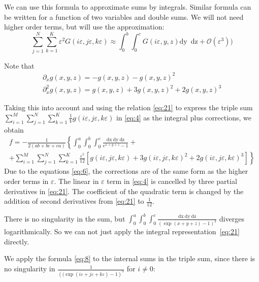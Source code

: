 \documentclass{article}
\newcommand{\dx}{\mathrm{dx}~}
\newcommand{\dy}{\mathrm{dy}~}
\newcommand{\dz}{\mathrm{dz}}
\begin{document}
We can use this formula to approximate sums by integrals. Similar formula can be written for a
function of two variables and double sums. We will not need higher order terms, but will use the
approximation:
\begin{equation}
\label{eq:8}
  \sum_{j=1}^{N}\sum_{k=1}^{K}\varepsilon^{2}G\left(i\varepsilon,j\varepsilon,k\varepsilon\right)\approx \int_{0}^{b}\int_{0}^{c}G(i\varepsilon,y,z) \dy\; \dz+\mathcal{O}(\varepsilon^{3}))
\end{equation}


Note that
\begin{equation}
  \label{eq:6}
  \begin{array}{c}
    \partial_{x}g(x,y,z)=-g(x,y,z)-g(x,y,z)^{2}\\
    \partial_{x}^{2}g(x,y,z)=g(x,y,z)+3g(x,y,z)^{2}+2g(x,y,z)^{3}
  \end{array}
\end{equation}

Taking this into account and using the relation \eqref{eq:21} to express the triple sum
$ \sum_{i=1}^{M} \sum_{j=1}^{N} \sum_{k=1}^{K} \frac{1}{V}    g(i\varepsilon,j\varepsilon,k\varepsilon)$
in \eqref{eq:4} as the integral plus corrections, we obtain
\begin{multline}
\label{eq:23}
 f=-\frac{1}{2(ab+bc+ca)}\left\{\int_{0}^{a} \int_{0}^{b}\int_{0}^{c}\frac{\dx \dy \dz}{e^{x+y+z}-1}+\right.\\
  \left.+\sum_{i=1}^{M}\sum_{j=1}^{N}\sum_{k=1}^{K}\frac{\varepsilon^{5}}{12}\left[g(i\varepsilon,j\varepsilon,k\varepsilon)+3
      g(i\varepsilon,j\varepsilon,k\varepsilon)^{2}+2
      g(i\varepsilon,j\varepsilon,k\varepsilon)^{3}\right]\right\}
\end{multline}
Due to the equations \eqref{eq:6}, the corrections are of the same form as the higher order terms in
$\varepsilon$. The linear in $\varepsilon$ term in \eqref{eq:4} is cancelled by three partial
derivatives in \eqref{eq:21}. The coefficient of the quadratic term is changed by the addition of
second derivatives from \eqref{eq:21} to $\frac{1}{12}$.


There is no singularity in the sum, but
$\int_{0}^{a} \int_{0}^{b}\int_{0}^{c}\frac{\dx \dy \dz}{(\exp(x+y+z)-1)^{3}}$ diverges
logarithmically. So we can not just apply the integral representation~\eqref{eq:21} directly.

We apply the formula \eqref{eq:8} to the internal sums in the triple sum, since there is no
singularity in $\frac{1}{\left((\exp(i\varepsilon+j\varepsilon+k\varepsilon)-1\right)^{3}}$ for
$i\neq 0$:
\end{document}
